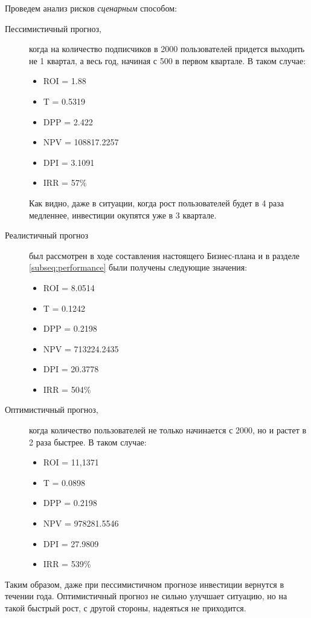 Проведем анализ рисков \textit{сценарным} способом:
\begin{description}
	\item[Пессимистичный прогноз,] когда на количество подписчиков в 2000 пользователей придется выходить не 1 квартал, а весь год, начиная с 500 в первом квартале. В таком случае:
		\begin{itemize}
			\item ROI = 1.88
			\item T = 0.5319
			\item DPP = 2.422
			\item NPV = 108817.2257
			\item DPI = 3.1091
			\item IRR = 57\%
		\end{itemize}
	Как видно, даже в ситуации, когда рост пользователей будет в 4 раза медленнее, инвестиции окупятся уже в 3 квартале.
	\item[Реалистичный прогноз] был рассмотрен в ходе составления настоящего Бизнес-плана и в разделе \ref{subseq:performance} были получены следующие значения:
	\begin{itemize}
		\item ROI = 8.0514
		\item T = 0.1242
		\item DPP = 0.2198
		\item NPV = 713224.2435
		\item DPI = 20.3778
		\item IRR = 504\%
	\end{itemize}
	\item[Оптимистичный прогноз,] когда количество пользователей не только начинается с 2000, но и растет в 2 раза быстрее. В таком случае:
	\begin{itemize}
		\item ROI = 11,1371
		\item T = 0.0898
		\item DPP = 0.2198
		\item NPV = 978281.5546
		\item DPI = 27.9809
		\item IRR = 539\%
	\end{itemize}
\end{description}

Таким образом, даже при пессимистичном прогнозе инвестиции вернутся в течении года. Оптимистичный прогноз не сильно улучшает ситуацию, но на такой быстрый рост, с другой стороны, надеяться не приходится.